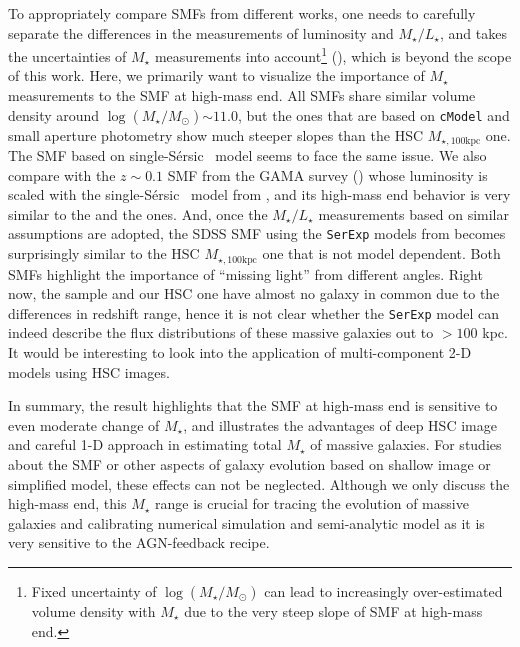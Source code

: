 \documentclass[a4paper,fleqn,usenatbib]{mnras}
\def\ser{{S\'{e}rsic\ }}
\def\mstar{{$M_{\star}$}}
\def\logms{{$\log (M_{\star}/M_{\odot})$}}
\def\mtot{{$M_{\star,100\mathrm{kpc}}$}}
\def\m2l{{$M_{\star}/L_{\star}$}}
\begin{document}
    To appropriately compare SMFs from different works, one needs to carefully 
    separate the differences in the measurements of luminosity and \m2l{}, and 
    takes the uncertainties of \mstar{} measurements into account\footnote{
    Fixed uncertainty of \logms{} can lead to increasingly over-estimated 
    volume density with \mstar{} due to the very steep slope of SMF at high-mass end.} 
    (\citealt{Bernardi2010, Bernardi2017}), which is beyond the scope of this work.  
    Here, we primarily want to visualize the importance of \mstar{} measurements 
    to the SMF at high-mass end. 
    All SMFs share similar volume density around \logms{}${\sim}11.0$, but the ones
    that are based on \texttt{cModel} and small aperture photometry show much 
    steeper slopes than the HSC \mtot{} one. 
    The SMF based on single-\ser{} model seems to face the same issue. 
    We also compare with the $z{\sim}0.1$ SMF from the GAMA survey 
    (\citealt{Wright2017}) whose luminosity is scaled with the single-\ser{} model
    from \citet{Kelvin2012}, and its high-mass end behavior is very similar to 
    the \citet{Leauthaud2016} and the \citet{Moustakas13} ones. 
    And, once the \m2l{} measurements based on similar assumptions are adopted, 
    the SDSS SMF using the \texttt{SerExp} models from \citet{Bernardi2017} becomes 
    surprisingly similar to the HSC \mtot{} one that is not model dependent.
    Both SMFs highlight the importance of ``missing light'' from different angles. 
    Right now, the \citet{Bernardi2017} sample and our HSC one have almost no 
    galaxy in common due to the differences in redshift range, hence it is not 
    clear whether the \texttt{SerExp} model can indeed describe the flux 
    distributions of these massive galaxies out to $>100$ kpc. 
    It would be interesting to look into the application of multi-component 
    2-D models using HSC images. 
            
    In summary, the result highlights that the SMF at high-mass end is sensitive to 
    even moderate change of \mstar{}, and illustrates the advantages of deep HSC image
    and careful 1-D approach in estimating total \mstar{} of massive galaxies.
    For studies about the SMF or other aspects of galaxy evolution based on 
    shallow image or simplified model, these effects can not be neglected.
    Although we only discuss the high-mass end, this \mstar{} range is crucial for 
    tracing the evolution of massive galaxies and calibrating numerical simulation 
    and semi-analytic model as it is very sensitive to the AGN-feedback recipe.   
\end{document}
